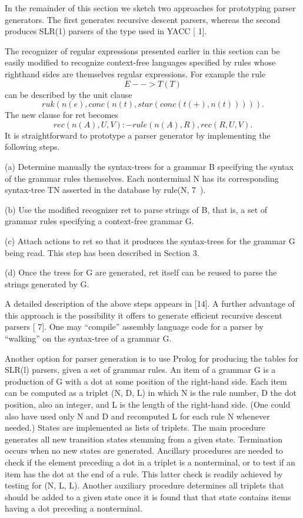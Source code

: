 In the remainder of this section we sketch two approaches for prototyping
parser generators. The first generates recursive descent parsers, whereas the
second produces SLR(1) parsers of the type used in YACC [ 1].

The recognizer of regular expressions presented earlier in this section can be
easily modified to recognize context-free languages specified by rules whose righthand
sides are themselves regular expressions. For example the rule
\[E --> T(T)\]
can be described by the unit clause
\[ruk(n(e), conc(n(t), star(conc(t(+), n(t))))).\]
The new clause for ret becomes
\[rec(n(A), U, V) :- rule(n(A), R), rec(R, U, V).\]
It is straightforward to prototype a parser generator by implementing the
following steps.

(a) Determine manually the syntax-trees for a grammar B specifying the syntax
of the grammar rules themselves. Each nonterminal N has its corresponding
syntax-tree TN asserted in the database by rule(N, 7~).

(b) Use the modified recognizer ret to parse strings of B, that is, a set of grammar
rules specifying a context-free grammar G.

(c) Attach actions to ret so that it produces the syntax-trees for the grammar G
being read. This step has been described in Section 3.

(d) Once the trees for G are generated, ret itself can be reused to parse the
strings generated by G.

A detailed description of the above steps appears in [14]. A further advantage of
this approach is the possibility it offers to generate efficient recursive descent
parsers [ 7]. One may “compile” assembly language code for a parser by “walking”
on the syntax-tree of a grammar G. 

Another option for parser generation is to use Prolog for producing the tables
for SLR(l) parsers, given a set of grammar rules. An item of a grammar G is a
production of G with a dot at some position of the right-hand side. Each item
can be computed as a triplet (N, D, L) in which N is the rule number, D the dot
position, also an integer, and L is the length of the right-hand side. (One could
also have used only N and D and recomputed L for each rule N whenever needed.)
States are implemented as lists of triplets. The main procedure generates all new
transition states stemming from a given state. Termination occurs when no new
states are generated. Ancillary procedures are needed to check if the element
preceding a dot in a triplet is a nonterminal, or to test if an item has the dot at
the end of a rule. This latter check is readily achieved by testing for (N, L, L).
Another auxiliary procedure determines all triplets that should be added to a
given state once it is found that that state contains items having a dot preceding
a nonterminal. 

